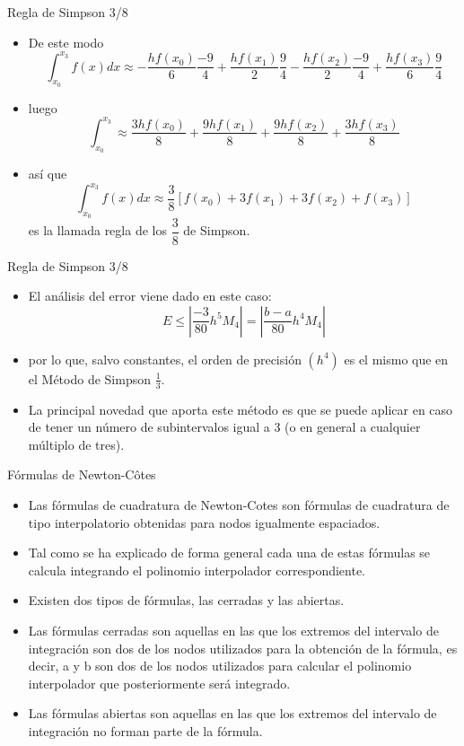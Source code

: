 \documentclass[12pt]{beamer}
\begin{document}
\begin{frame}{Regla de Simpson 3/8}
  \begin{itemize}
    \item De este modo
    $$
    \int_{x_0}^{x_3}f(x)dx \approx -\dfrac{hf(x_0)}{6}\dfrac{-9}{4} + \dfrac{hf(x_1)}{2}\dfrac{9}{4} - \dfrac{hf(x_2)}{2}\dfrac{-9}{4} + \dfrac{hf(x_3)}{6}\dfrac{9}{4}
    $$
    \item<2->luego
    $$
    \int_{x_0}^{x_3} \approx \dfrac{3hf(x_0)}{8} + \dfrac{9hf(x_1)}{8} + \dfrac{9hf(x_2)}{8} + \dfrac{3hf(x_3)}{8}
    $$
    \item<3-> as\'i que 
    $$
    \int_{x_0}^{x_3}f(x)dx \approx \dfrac{3}{8}\left[f(x_0)+3f(x_1)+3f(x_2)+f(x_3)\right]
    $$
    es la llamada regla de los $\dfrac{3}{8}$ de Simpson.
  \end{itemize}
\end{frame}
\begin{frame}{Regla de Simpson 3/8}
  \begin{itemize}
    \item El an\'alisis del error viene dado en este caso:
    $$
    E \leq \left|\frac{-3}{80}h^5M_4\right| = \left|\frac{b-a}{80}h^4M_4\right|
    $$
    \item<2-> por lo que, salvo constantes, el orden de precisi\'on $(h^4)$ es el mismo que en el M\'etodo de Simpson $\frac{1}{3}$.
    \item<3-> La principal novedad que aporta este m\'etodo es que se puede aplicar  en caso de tener un n\'umero de subintervalos
    igual a 3 (o en general a cualquier m\'ultiplo de tres).
  \end{itemize}
\end{frame}
\begin{frame}{F\'ormulas de Newton-C\^otes}
  \begin{itemize}
    \item Las fórmulas de cuadratura de Newton-Cotes son fórmulas de cuadratura de tipo interpolatorio obtenidas
    para nodos igualmente espaciados.
    \item<2-> Tal como se ha explicado de forma general cada una de estas fórmulas
    se calcula integrando el polinomio interpolador correspondiente.
    \item<3-> Existen dos tipos de fórmulas, las cerradas y las abiertas.
    \item<4-> Las fórmulas cerradas son aquellas en las que los extremos del intervalo de integración son dos de los nodos utilizados para la obtención de la fórmula, es decir, a y b son dos de los nodos utilizados para calcular el
    polinomio interpolador que posteriormente será integrado.
    \item<5-> Las fórmulas abiertas son aquellas en las que los extremos del intervalo de integración no forman parte de la fórmula.
  \end{itemize}
\end{frame}
\end{document}
